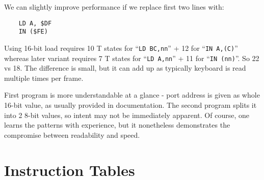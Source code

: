 \documentclass[twoside,openright,a4paper]{book}
\begin{document}
We can slightly improve performance if we replace first two lines with:

\begin{Verbatim}
	LD A, $DF
	IN ($FE)
\end{Verbatim}

Using 16-bit load requires 10 T states for ``{\tt LD BC,nn}'' + 12 for ``{\tt IN A,(C)}'' whereas later variant requires 7 T states for ``{\tt LD A,nn}'' + 11 for ``{\tt IN (nn)}''. So 22 vs 18. The difference is small, but it can add up as typically keyboard is read multiple times per frame.

First program is more understandable at a glance - port address is given as whole 16-bit value, as usually provided in documentation. The second program splits it into 2 8-bit values, so intent may not be immediately apparent. Of course, one learns the patterns with experience, but it nonetheless demonstrates the compromise between readability and speed.


\chapter{Instruction Tables}

\minitoc

\newcommand{\instrtable}[1]{
	{
		\tt
		\small 
		\setlength{\fboxsep}{0.25mm}
		\setlength{\tabcolsep}{1mm}
		
		\begin{tabular}{llcccccccccccccccl}

			\hline
			
			& 
			Symbolic &
			\multicolumn{8}{c}{Flags} & 
			\multicolumn{3}{c}{Opcode} &
			& & 
			& & \\

			Mnemonic & 
			Operation &
			SF & ZF & YF & HF & XF & PF & NF & CF &
			76 & 543 & 210 & 
			Hex & B & 
			Mc & Ts & 
			Comments \\

			\hline

			#1

		\end{tabular}
	}
}

\newcommand{\instrempty}[1]{
	\multicolumn{17}{l}{} & #1 \\
}

\newcommand{\instrnotetitle}{
	\scriptsize
	Notes:
}
\end{document}
